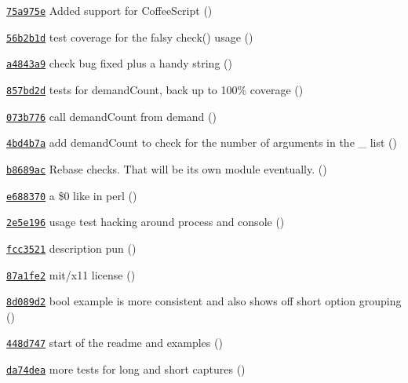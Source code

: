\begin{DoxyItemize}
\item \href{https://github.com/bcoe/yargs/commit/75a975eed8430d28e2a79dc9e6d819ad545f4587}{\tt 75a975e} Added support for Coffee\+Script ()
\item \href{https://github.com/bcoe/yargs/commit/56b2b1de8d11f8a2b91979d8ae2d6db02d8fe64d}{\tt 56b2b1d} test coverage for the falsy check() usage ()
\item \href{https://github.com/bcoe/yargs/commit/a4843a9f0e69ffb4afdf6a671d89eb6f218be35d}{\tt a4843a9} check bug fixed plus a handy string ()
\item \href{https://github.com/bcoe/yargs/commit/857bd2db933a5aaa9cfecba0ced2dc9b415f8111}{\tt 857bd2d} tests for demand\+Count, back up to 100\% coverage ()
\item \href{https://github.com/bcoe/yargs/commit/073b7768ebd781668ef05c13f9003aceca2f5c35}{\tt 073b776} call demand\+Count from demand ()
\item \href{https://github.com/bcoe/yargs/commit/4bd4b7a085c8b6ce1d885a0f486cc9865cee2db1}{\tt 4bd4b7a} add demand\+Count to check for the number of arguments in the \+\_\+ list ()
\item \href{https://github.com/bcoe/yargs/commit/b8689ac68dacf248119d242bba39a41cb0adfa07}{\tt b8689ac} Rebase checks. That will be its own module eventually. ()
\item \href{https://github.com/bcoe/yargs/commit/e688370b576f0aa733c3f46183df69e1b561668e}{\tt e688370} a \$0 like in perl ()
\item \href{https://github.com/bcoe/yargs/commit/2e5e1960fc19afb21fb3293752316eaa8bcd3609}{\tt 2e5e196} usage test hacking around process and console ()
\item \href{https://github.com/bcoe/yargs/commit/fcc352163fbec6a1dfe8caf47a0df39de24fe016}{\tt fcc3521} description pun ()
\item \href{https://github.com/bcoe/yargs/commit/87a1fe29037ca2ca5fefda85141aaeb13e8ce761}{\tt 87a1fe2} mit/x11 license ()
\item \href{https://github.com/bcoe/yargs/commit/8d089d24cd687c0bde3640a96c09b78f884900dd}{\tt 8d089d2} bool example is more consistent and also shows off short option grouping ()
\item \href{https://github.com/bcoe/yargs/commit/448d7473ac68e8e03d8befc9457b0d9e21725be0}{\tt 448d747} start of the readme and examples ()
\item \href{https://github.com/bcoe/yargs/commit/da74dea799a9b59dbf022cbb8001bfdb0d52eec9}{\tt da74dea} more tests for long and short captures ()

\end{DoxyItemize}
